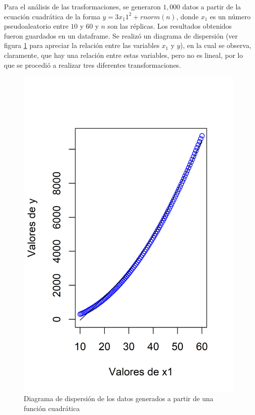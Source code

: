 \documentclass{article}
\begin{document}
Para el análisis de las trasformaciones, se generaron $1,000$ datos a partir de la ecuación cuadrática de la forma $y=3x_{1}1^2 + rnorm(n)$, donde $x_{1}$ es un número pseudoaleatorio entre $10$ y $60$ y $n$ son las réplicas. Los resultados obtenidos fueron guardados en un dataframe. Se realizó un diagrama de dispersión (ver figura \ref{f3} para apreciar la relación entre las variables $x_{1}$ y $y$), en la cual se observa, claramente, que hay una relación entre estas variables, pero no es lineal, por lo que se procedió a realizar tres diferentes transformaciones.

\begin{figure}
\centering
\includegraphics[scale=0.9]{Figures/cuadratica.png}
\caption{Diagrama de dispersión de los datos generados a partir de una función cuadrática}
\label{f3}
\end{figure}
\end{document}
